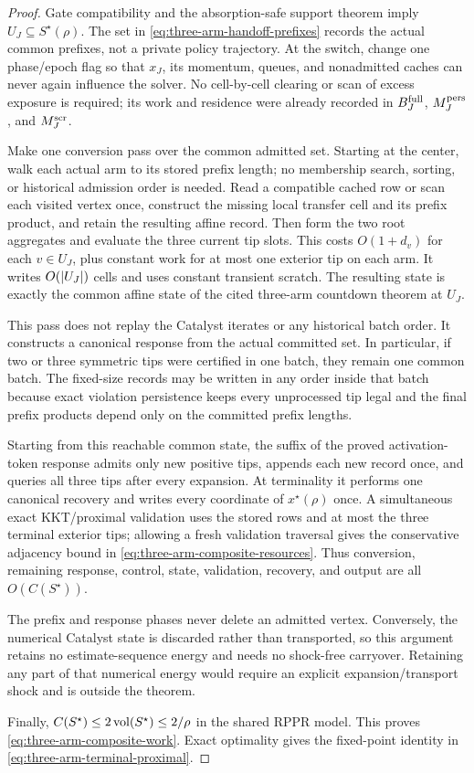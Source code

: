 \begin{proof}
Gate compatibility and the absorption-safe support theorem imply
$U_J\subseteq S^\star(\rho)$. The set in
\cref{eq:three-arm-handoff-prefixes} records the actual common prefixes, not a
private policy trajectory. At the switch, change one phase/epoch flag so that
$x_J$, its momentum, queues, and nonadmitted caches can never again influence
the solver. No cell-by-cell clearing or scan of excess exposure is required;
its work and residence were already recorded in $B_J^{\rm full}$,
$M_J^{\rm pers}$, and $M_J^{\rm scr}$.

Make one conversion pass over the common admitted set. Starting at the center,
walk each actual arm to its stored prefix length; no membership search,
sorting, or historical admission order is needed. Read a
compatible cached row or scan each visited vertex once, construct the missing
local transfer cell and its prefix product, and retain the resulting affine
record. Then form the two root aggregates and evaluate the three current tip
slots. This costs $O(1+d_v)$ for each $v\in U_J$, plus constant work for at
most one exterior tip on each arm. It writes $O(\left\lvert U_J \right\rvert)$ cells and uses
constant transient scratch. The resulting state is exactly the common affine
state of the cited three-arm countdown theorem at $U_J$.

This pass does not replay the Catalyst iterates or any historical batch order.
It constructs a canonical response from the actual committed set. In
particular, if two or three symmetric tips were certified in one batch, they
remain one common batch. The fixed-size records may be written in any order
inside that batch because exact violation persistence keeps every unprocessed
tip legal and the final prefix products depend only on the committed prefix
lengths.

Starting from this reachable common state, the suffix of the proved
activation-token response admits only new positive tips, appends each new
record once, and queries all three tips after every expansion. At terminality
it performs one canonical recovery and writes every coordinate of
$x^\star(\rho)$ once. A simultaneous exact KKT/proximal validation uses the
stored rows and at most the three terminal exterior tips; allowing a fresh
validation traversal gives the conservative adjacency bound in
\cref{eq:three-arm-composite-resources}. Thus conversion, remaining response,
control, state, validation, recovery, and output are all
$O(C(S^\star))$.

The prefix and response phases never delete an admitted vertex. Conversely,
the numerical Catalyst state is discarded rather than transported, so this
argument retains no estimate-sequence energy and needs no shock-free
carryover. Retaining any part of that numerical energy would require an
explicit expansion/transport shock and is outside the theorem.

Finally, $C(S^\star)\leq2\operatorname{vol}(S^\star)\leq2/\rho$ in the shared RPPR model.
This proves \cref{eq:three-arm-composite-work}. Exact optimality gives the
fixed-point identity in \cref{eq:three-arm-terminal-proximal}.
\end{proof}

